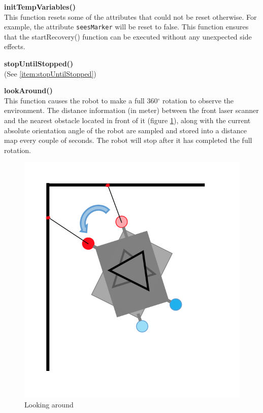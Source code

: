 \begin{description}
\item \textbf{initTempVariables()} \hfill \\
This function resets some of the attributes that could not be reset otherwise. For example, the attribute \texttt{seesMarker} will be reset to false. This function ensures that the startRecovery() function can be executed without any unexpected side effects.

\item \textbf{stopUntilStopped()} \hfill \\
(See \ref{item:stopUntilStopped})

\item \textbf{lookAround()} \hfill \\
This function causes the robot to make a full 360$^{\circ}$ rotation to observe the environment. The distance information (in meter) between the front laser scanner and the nearest obstacle located in front of it (figure \ref{best}), along with the current absolute orientation angle of the robot are sampled and stored into a distance map every couple of seconds. The robot will stop after it has completed the full rotation.

\begin{figure}[htb]
\centering
\includegraphics[scale=0.5]{graphics/find_best_angle.png}
\caption{Looking around}
\label{best}
\centering
\end{figure}



\end{description}
